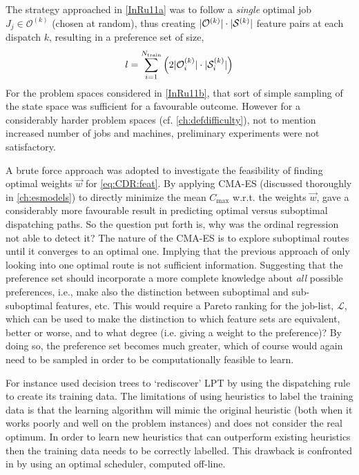 The strategy approached in  \cref{InRu11a} was to follow a \emph{single} 
optimal job $J_j\in\mathcal{O}^{(k)}$ (chosen at random), thus creating 
$\lvert\mathcal{O}^{(k)}\rvert\cdot\lvert\mathcal{S}^{(k)}\rvert$ feature pairs at each 
dispatch $k$, resulting in a preference set of size,
\begin{equation}\label{eq:sizePsi_b}
l =  \sum_{i=1}^{N_{\text{train}}} \left(2 \abs{\mathcal{O}^{(k)}_i}\cdot 
\abs{\mathcal{S}^{(k)}_i} \right)
\end{equation}
For the problem spaces considered in \cref{InRu11b}, that sort of simple 
sampling of the state space was sufficient for a favourable outcome. 
However for a considerably harder problem spaces (cf. \cref{ch:defdifficulty}), 
not to mention increased number of jobs and machines, preliminary experiments 
were not satisfactory. 

A brute force approach was adopted to investigate the feasibility of finding 
optimal weights $\vec{w}$ for \cref{eq:CDR:feat}. 
By applying CMA-ES (discussed thoroughly in \cref{ch:esmodels}) to directly 
minimize the mean $C_{\max}$  w.r.t. the weights $\vec{w}$, gave a considerably 
more favourable result in predicting optimal versus suboptimal dispatching 
paths. 
So the question put forth is, why was the ordinal regression not able to detect 
it?
The nature of the CMA-ES is to explore suboptimal routes until it converges to 
an optimal one. 
Implying that the previous approach of only looking into one optimal route is 
not sufficient information. 
Suggesting that the preference set should incorporate a more complete knowledge 
about \emph{all} possible preferences, i.e., make also the distinction between 
suboptimal and sub-suboptimal features, etc.  
This would require a Pareto ranking for the job-list, $\mathcal{L}$, which can 
be used to make the distinction to which feature sets are equivalent, better or 
worse, and to what degree (i.e. giving a weight to the preference)? 
By doing so, the preference set becomes much greater, which of course would 
again need to be sampled in order to be computationally feasible to learn. 

For instance \cite{Siggi05} used decision trees to `rediscover' LPT by using 
the dispatching rule to create its training data. The limitations of using 
heuristics to label the training data is that the learning algorithm will mimic 
the original heuristic (both when it works poorly and well on the problem 
instances) and does not consider the real optimum. In order to learn new 
heuristics that can outperform existing heuristics then the training data needs 
to be correctly labelled. This drawback is confronted in 
\citep{Malik08,Russell09,Siggi10} by using an optimal scheduler, computed 
off-line. 

